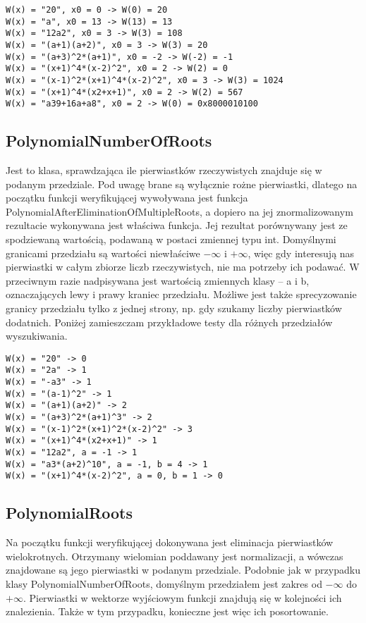 \documentclass[twoside,a4paper]{book}
\begin{document}
\begin{lstlisting}
W(x) = "20", x0 = 0 -> W(0) = 20
W(x) = "a", x0 = 13 -> W(13) = 13
W(x) = "12a2", x0 = 3 -> W(3) = 108
W(x) = "(a+1)(a+2)", x0 = 3 -> W(3) = 20
W(x) = "(a+3)^2*(a+1)", x0 = -2 -> W(-2) = -1
W(x) = "(x+1)^4*(x-2)^2", x0 = 2 -> W(2) = 0
W(x) = "(x-1)^2*(x+1)^4*(x-2)^2", x0 = 3 -> W(3) = 1024
W(x) = "(x+1)^4*(x2+x+1)", x0 = 2 -> W(2) = 567
W(x) = "a39+16a+a8", x0 = 2 -> W(0) = 0x8000010100
\end{lstlisting}

\subsection{PolynomialNumberOfRoots}

Jest to klasa, sprawdzająca ile pierwiastków rzeczywistych znajduje się w podanym przedziale. Pod uwagę brane są wyłącznie rożne pierwiastki, dlatego na początku funkcji weryfikującej wywoływana jest funkcja PolynomialAfterEliminationOfMultipleRoots, a dopiero na jej znormalizowanym rezultacie wykonywana jest właściwa funkcja. Jej rezultat porównywany jest ze spodziewaną wartością, podawaną w postaci zmiennej typu int. Domyślnymi granicami przedziału są wartości niewłaściwe $-\infty$ i $+\infty$, więc gdy interesują nas pierwiastki w całym zbiorze liczb rzeczywistych, nie ma potrzeby ich podawać. W przeciwnym razie nadpisywana jest wartością zmiennych klasy – a i b, oznaczających lewy i prawy kraniec przedziału. Możliwe jest także sprecyzowanie granicy przedziału tylko z jednej strony, np. gdy szukamy liczby pierwiastków dodatnich. Poniżej zamieszczam przykładowe testy dla różnych przedziałów wyszukiwania.

\begin{lstlisting}
W(x) = "20" -> 0
W(x) = "2a" -> 1
W(x) = "-a3" -> 1
W(x) = "(a-1)^2" -> 1
W(x) = "(a+1)(a+2)" -> 2
W(x) = "(a+3)^2*(a+1)^3" -> 2
W(x) = "(x-1)^2*(x+1)^2*(x-2)^2" -> 3
W(x) = "(x+1)^4*(x2+x+1)" -> 1
W(x) = "12a2", a = -1 -> 1
W(x) = "a3*(a+2)^10", a = -1, b = 4 -> 1
W(x) = "(x+1)^4*(x-2)^2", a = 0, b = 1 -> 0
\end{lstlisting}

\subsection{PolynomialRoots}

Na początku funkcji weryfikującej dokonywana jest eliminacja pierwiastków wielokrotnych. Otrzymany wielomian poddawany jest normalizacji, a wówczas znajdowane są jego pierwiastki w podanym przedziale. Podobnie jak w przypadku klasy PolynomialNumberOfRoots, domyślnym przedziałem jest zakres od $-\infty$ do $+\infty$. Pierwiastki w wektorze wyjściowym funkcji znajdują się w kolejności ich znalezienia. Także w tym przypadku, konieczne jest więc ich posortowanie.
\end{document}
